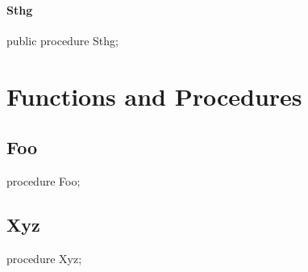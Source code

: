 \documentclass{report}
\begin{document}
\paragraph*{Sthg}\hspace*{\fill}

\begin{list}{}{
\setlength{\itemindent}{0cm}
\setlength{\listparindent}{0cm}
\setlength{\leftmargin}{\evensidemargin}
\addtolength{\leftmargin}{\tmplength}
\settowidth{\labelsep}{X}
\addtolength{\leftmargin}{\labelsep}
\setlength{\labelwidth}{\tmplength}
}
\begin{flushleft}
\item[\textbf{Declaration}\hfill]
\begin{ttfamily}
public procedure Sthg;\end{ttfamily}


\end{flushleft}
\end{list}
\section{Functions and Procedures}
\subsection*{Foo}
\begin{list}{}{
\setlength{\itemindent}{0cm}
\setlength{\listparindent}{0cm}
\setlength{\leftmargin}{\evensidemargin}
\addtolength{\leftmargin}{\tmplength}
\settowidth{\labelsep}{X}
\addtolength{\leftmargin}{\labelsep}
\setlength{\labelwidth}{\tmplength}
}
\begin{flushleft}
\item[\textbf{Declaration}\hfill]
\begin{ttfamily}
procedure Foo;\end{ttfamily}


\end{flushleft}
\end{list}
\subsection*{Xyz}
\begin{list}{}{
\setlength{\itemindent}{0cm}
\setlength{\listparindent}{0cm}
\setlength{\leftmargin}{\evensidemargin}
\addtolength{\leftmargin}{\tmplength}
\settowidth{\labelsep}{X}
\addtolength{\leftmargin}{\labelsep}
\setlength{\labelwidth}{\tmplength}
}
\begin{flushleft}
\item[\textbf{Declaration}\hfill]
\begin{ttfamily}
procedure Xyz;\end{ttfamily}


\end{flushleft}
\end{list}
\end{document}
